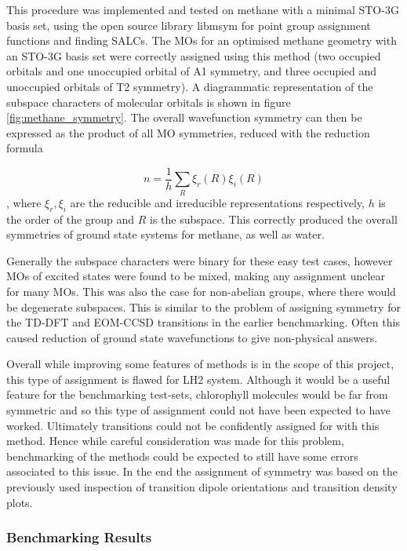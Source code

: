 This procedure was implemented and tested on methane with a minimal STO-3G basis set,
using the open source library libmsym \cite{libmsym} for point group assignment
functions and finding SALCs. The MOs for an optimised methane geometry with an STO-3G 
basis set were correctly assigned using this method (two occupied orbitals and one
unoccupied orbital of A1 symmetry, and three occupied and unoccupied orbitals of 
T2 symmetry). A diagrammatic representation of the subspace characters of molecular
orbitals is shown in figure \ref{fig:methane_symmetry}. The overall wavefunction
symmetry can then be expressed as the product of all MO symmetries, reduced with
the reduction formula

\begin{equation}
n = \frac{1}{h} \sum_R \xi_r \left( R \right) \xi_i \left( R \right)
\end{equation}
%
, where $\xi_r, \xi_i$ are the reducible and irreducible representations respectively,
$h$ is the order of the group and $R$ is the subspace. This correctly produced
the overall symmetries of ground state systems for methane, as well as water.

Generally the subspace characters were binary for these easy test cases, however 
MOs of excited states were found to be mixed, making any assignment unclear for
many MOs. This was also the case for non-abelian groups, where there would be degenerate
subspaces. This is similar to the problem of assigning symmetry for the TD-DFT and
EOM-CCSD transitions in the earlier benchmarking. Often this caused reduction of ground
state wavefunctions to give non-physical answers.

Overall while improving some features of \dscf methods is in the scope of this project,
this type of assignment is flawed for LH2 system. Although it would be a useful 
feature for the benchmarking test-sets, chlorophyll molecules would be far from
symmetric and so this type of assignment could not have been expected to have worked.
Ultimately transitions could not be confidently assigned for \dscf with this method.
Hence while careful consideration was made for this problem, benchmarking of the
\dxtb methods could be expected to still have some errors associated to this issue.
In the end the assignment of symmetry was based on the previously used inspection
of transition dipole orientations and transition density plots.

\subsubsection{\dxtb Benchmarking Results}
\label{subsubsec:imp_of_benchmarking}

